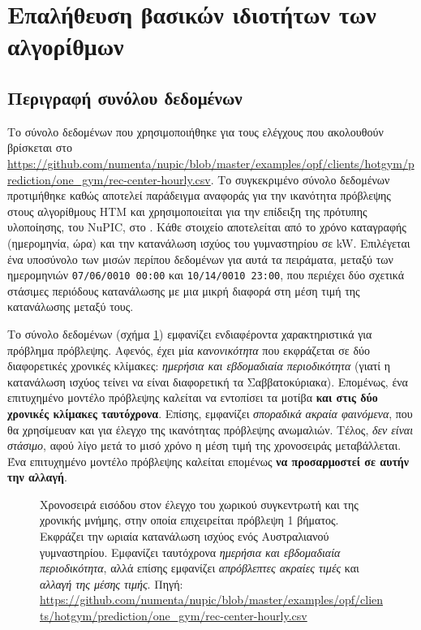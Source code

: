 \section{Επαλήθευση βασικών ιδιοτήτων των αλγορίθμων}

\subsection{Περιγραφή συνόλου δεδομένων} \label{conc:tspred-dataset}

	Το σύνολο δεδομένων που χρησιμοποιήθηκε για τους ελέγχους που ακολουθούν βρίσκεται στο \url{https://github.com/numenta/nupic/blob/master/examples/opf/clients/hotgym/prediction/one_gym/rec-center-hourly.csv}.
	Το συγκεκριμένο σύνολο δεδομένων προτιμήθηκε καθώς αποτελεί παράδειγμα αναφοράς για την ικανότητα πρόβλεψης στους αλγορίθμους HTM
	και χρησιμοποιείται για την επίδειξη της πρότυπης υλοποίησης, του NuPIC, στο 	\parencite{numentaNuPICHotGymPrediction2019}.
	Κάθε στοιχείο αποτελείται από το χρόνο καταγραφής (ημερομηνία, ώρα) και την κατανάλωση ισχύος του γυμναστηρίου σε kW.
	Επιλέγεται ένα υποσύνολο των μισών περίπου δεδομένων για αυτά τα πειράματα, μεταξύ των ημερομηνιών \texttt{07/06/0010 00:00}
	και \texttt{10/14/0010 23:00}, που περιέχει δύο σχετικά στάσιμες περιόδους κατανάλωσης με μια μικρή διαφορά στη μέση τιμή της κατανάλωσης μεταξύ τους.

	Το σύνολο δεδομένων (σχήμα \ref{fig:tshotgym}) εμφανίζει ενδιαφέροντα χαρακτηριστικά για πρόβλημα πρόβλεψης.
	Αφενός, έχει μία \textit{κανονικότητα} που εκφράζεται σε δύο διαφορετικές χρονικές κλίμακες: \textit{ημερήσια και εβδομαδιαία περιοδικότητα}
	(γιατί η κατανάλωση ισχύος τείνει να είναι διαφορετική τα Σαββατοκύριακα).
	Επομένως, ένα επιτυχημένο μοντέλο πρόβλεψης καλείται να εντοπίσει τα μοτίβα \textbf{και στις δύο χρονικές κλίμακες ταυτόχρονα}.
	Επίσης, εμφανίζει \textit{σποραδικά ακραία φαινόμενα}, που θα χρησίμευαν και για έλεγχο της ικανότητας πρόβλεψης ανωμαλιών.
	Τέλος, \textit{δεν είναι στάσιμο}, αφού λίγο μετά το μισό χρόνο η μέση τιμή της χρονοσειράς μεταβάλλεται.
	Ένα επιτυχημένο μοντέλο πρόβλεψης καλείται επομένως \textbf{να προσαρμοστεί σε αυτήν την αλλαγή}.

	\begin{figure}
		\centering
		
		\caption[χρονοσειρά κατανάλωσης ισχύος για πείραμα πρόβλεψης]{Χρονοσειρά εισόδου στον έλεγχο του χωρικού συγκεντρωτή και της χρονικής μνήμης, στην οποία επιχειρείται πρόβλεψη 1 βήματος.
		Εκφράζει την ωριαία κατανάλωση ισχύος ενός Αυστραλιανού γυμναστηρίου.
		Εμφανίζει ταυτόχρονα \textit{ημερήσια και εβδομαδιαία περιοδικότητα}, αλλά επίσης εμφανίζει
		\textit{απρόβλεπτες ακραίες τιμές} και \textit{αλλαγή της μέσης τιμής}.
		Πηγή: \url{https://github.com/numenta/nupic/blob/master/examples/opf/clients/hotgym/prediction/one_gym/rec-center-hourly.csv}}
		\label{fig:tshotgym}
	\end{figure}

